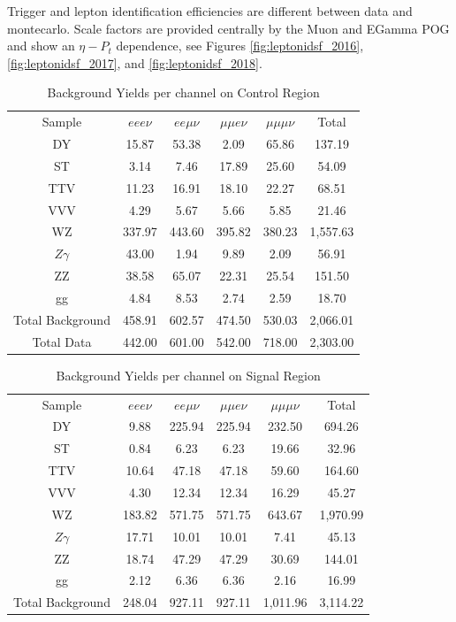 Trigger and lepton identification efficiencies are different between data
and montecarlo. Scale factors are provided centrally by the Muon and EGamma POG
and show an $\eta-P_{t}$ dependence, see Figures \ref{fig:leptonidsf_2016},
\ref{fig:leptonidsf_2017}, and \ref{fig:leptonidsf_2018}.

\begin{table}
  \caption{Background Yields per
    channel on Control Region}
 \begin{center}
 \begin{tabular}{cccccc}\hline\hline
Sample & $eee\nu$ & $ee\mu\nu$ & $\mu\mu e\nu$ & $\mu\mu\mu\nu$ & Total \\
DY & 15.87 & 53.38 & 2.09 & 65.86 & 137.19 \\
ST & 3.14 & 7.46 & 17.89 & 25.60 & 54.09 \\
TTV & 11.23 & 16.91 & 18.10 & 22.27 & 68.51 \\
VVV & 4.29 & 5.67 & 5.66 & 5.85 & 21.46 \\
WZ & 337.97 & 443.60 & 395.82 & 380.23 & 1,557.63 \\
$Z\gamma$ & 43.00 & 1.94 & 9.89 & 2.09 & 56.91 \\
ZZ & 38.58 & 65.07 & 22.31 & 25.54 & 151.50 \\
gg & 4.84 & 8.53 & 2.74 & 2.59 & 18.70 \\ \hline
Total Background & 458.91 & 602.57 & 474.50 & 530.03 & 2,066.01 \\ \hline
Total Data & 442.00 & 601.00 & 542.00 & 718.00 & 2,303.00 \\ \hline
 \end{tabular}
 \end{center}
 \label{tab:BackgroundYieldsCR}
\end{table}

\begin{table}
  \caption{Background Yields per
    channel on Signal Region}
 \begin{center}
 \begin{tabular}{cccccc}\hline\hline
Sample & $eee\nu$ & $ee\mu\nu$ & $\mu\mu e\nu$ & $\mu\mu\mu\nu$ & Total \\
DY & 9.88 & 225.94 & 225.94 & 232.50 & 694.26 \\
ST & 0.84 & 6.23 & 6.23 & 19.66 & 32.96 \\
TTV & 10.64 & 47.18 & 47.18 & 59.60 & 164.60 \\
VVV & 4.30 & 12.34 & 12.34 & 16.29 & 45.27 \\
WZ & 183.82 & 571.75 & 571.75 & 643.67 & 1,970.99 \\
$Z\gamma$ & 17.71 & 10.01 & 10.01 & 7.41 & 45.13 \\
ZZ & 18.74 & 47.29 & 47.29 & 30.69 & 144.01 \\
gg & 2.12 & 6.36 & 6.36 & 2.16 & 16.99 \\ \hline
Total Background & 248.04 & 927.11 & 927.11 & 1,011.96 & 3,114.22 \\ \hline
 \end{tabular}
 \end{center}
 \label{tab:BackgroundYieldsSR}
\end{table}
